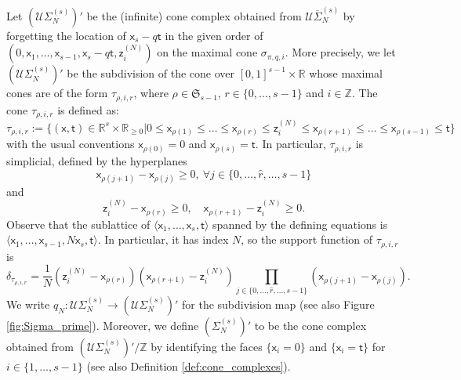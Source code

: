 \documentclass[11pt]{article}
\theoremstyle{definition}
\begin{document}
Let $(\mathcal U\Sigma_N^{(s)})'$ be the (infinite) cone complex obtained from
$\mathcal U\overline{\Sigma}_N^{(s)}$ by forgetting the location of $\mathsf{x}_s-q\mathsf{t}$ in the
given order of $(0,\mathsf{x}_1,\dots,\mathsf{x}_{s-1},\mathsf{x}_{s}-q\mathsf{t},\mathsf{z}_i^{(N)})$ on
the maximal cone $\sigma_{\pi,q,i}$. More precisely, we let
$(\mathcal U\Sigma_N^{(s)})'$ be the subdivision of the cone over
$[0,1]^{s-1}\times \mathbb{R}$ whose maximal cones are of the
form $\tau_{\rho,i,r}$, where $\rho\in \mathfrak S_{s-1}$, $r\in \{0,\dots,s-1\}$
and $i\in \mathbb{Z}$. The cone $\tau_{\rho,i,r}$ is defined as:
$$\tau_{\rho,i,r}:=\{(\mathsf{x},\mathsf{t})\in \mathbb{R}^{s}\times\mathbb{R}_{\ge 0}|0\le \mathsf{x}_{\rho(1)}\le\dots \le \mathsf{x}_{\rho(r)}\le \mathsf{z}_i^{(N)}\le \mathsf{x}_{\rho(r+1)}\le \dots\le \mathsf{x}_{\rho(s-1)}\le \mathsf{t}\}$$
with the usual conventions $\mathsf{x}_{\rho(0)}=0$ and $\mathsf{x}_{\rho(s)}=\mathsf{t}$.
In particular, $\tau_{\rho,i,r}$ is simplicial, defined by the
hyperplanes
$$\mathsf{x}_{\rho(j+1)}-\mathsf{x}_{\rho(j)}\ge 0,\ \forall j\in \{0,\dots,\hat{r},\dots,s-1\}$$
and
$$\mathsf{z}_i^{(N)}-\mathsf{x}_{\rho(r)}\ge 0,\quad \mathsf{x}_{\rho(r+1)}-\mathsf{z}_i^{(N)}\ge 0.$$
Observe that the sublattice of $\langle \mathsf{x}_1,\dots,\mathsf{x}_s,\mathsf{t}\rangle$
spanned by the defining equations is
$\langle \mathsf{x}_1,\dots,\mathsf{x}_{s-1},N\mathsf{x}_s,\mathsf{t}\rangle$. In particular, it has index
$N$, so the support function of $\tau_{\rho,i,r}$ is
$$\delta_{\tau_{\rho,i,r}}=\frac{1}{N}(\mathsf{z}_i^{(N)}-\mathsf{x}_{\rho(r)})(\mathsf{x}_{\rho(r+1)}-\mathsf{z}_i^{(N)})\prod_{j\in \{0,\dots,\hat{r},\dots,s-1\}}^{}(\mathsf{x}_{\rho(j+1)}-\mathsf{x}_{\rho(j)}).$$
We write $q_N:\mathcal U\Sigma_N^{(s)}\to (\mathcal U\Sigma_N^{(s)})'$ for the subdivision
map (see also Figure \ref{fig:Sigma_prime}). Moreover, we define $(\Sigma_N^{(s)})'$ to be the cone complex
obtained from $(\mathcal{U}\Sigma_N^{(s)})'/\mathbb{Z}$ by identifying the faces $\{\mathsf{x}_i=0\}$ and $\{\mathsf{x}_i=\mathsf{t}\}$
for $i\in \{1,\dots,s-1\}$ (see also Definition \ref{def:cone_complexes}).
\end{document}
